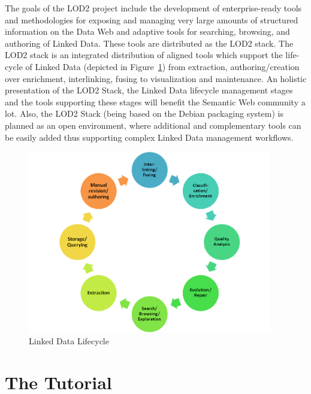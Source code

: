 \documentclass[a4paper, 11pt]{llncs}
\begin{document}
The goals of the LOD2 project include the development of enterprise-ready tools and methodologies for exposing and managing very large amounts of structured information on the Data Web and adaptive tools for searching, browsing, and authoring of Linked Data.
These tools are distributed as the LOD2 stack.
The LOD2 stack is an integrated distribution of aligned tools which support the life-cycle of Linked Data (depicted in Figure~\ref{fig:lifecycle}) from extraction, authoring/creation over enrichment, interlinking, fusing to visualization and maintenance.
An holistic presentation of the LOD2 Stack, the Linked Data lifecycle management stages and the tools supporting these stages will benefit the Semantic Web community a lot.
Also, the LOD2 Stack (being based on the Debian packaging system) is planned as an open environment, where additional and complementary tools can be easily added thus supporting complex Linked Data management workflows.

\begin{figure}[t]
	\centering
		\includegraphics[width=0.95\textwidth]{lod-lifecycle-small}
	\caption{Linked Data Lifecycle}
	\label{fig:lifecycle}
\end{figure}

\section{The Tutorial}

\end{document}
